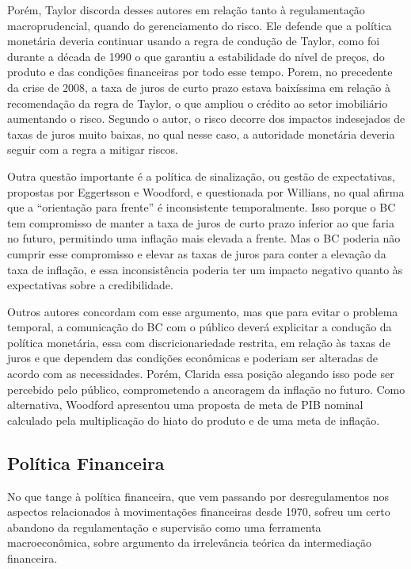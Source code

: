 \documentclass[report]{uftex}
\begin{document}
Porém, Taylor discorda desses autores em relação tanto à regulamentação macroprudencial, quando do gerenciamento do risco. Ele defende que a política monetária deveria continuar usando a regra de condução de Taylor, como foi durante a década de 1990 o que garantiu a estabilidade do nível de preços, do produto e das condições financeiras por todo esse tempo. Porem, no precedente da crise de 2008, a taxa de juros de curto prazo estava baixíssima em relação à recomendação da regra de Taylor, o que ampliou o crédito ao setor imobiliário aumentando o risco. Segundo o autor, o risco decorre dos impactos indesejados de taxas de juros muito baixas, no qual nesse caso, a autoridade monetária deveria seguir com a regra a mitigar riscos. 

Outra questão importante é a política de sinalização, ou gestão de expectativas, propostas por Eggertsson e Woodford, e questionada por Willians, no qual afirma que a ``orientação para frente” é inconsistente temporalmente. Isso porque o BC tem compromisso de manter a taxa de juros de curto prazo inferior ao que faria no futuro, permitindo uma inflação mais elevada a frente. Mas o BC poderia não cumprir esse compromisso e elevar as taxas de juros para conter a elevação da taxa de inflação, e essa inconsistência poderia ter um impacto negativo quanto às expectativas sobre a credibilidade.

Outros autores concordam com esse argumento, mas que para evitar o problema temporal, a comunicação do BC com o público deverá explicitar a condução da política monetária, essa com discricionariedade restrita, em relação às taxas de juros e que dependem das condições econômicas e poderiam ser alteradas de acordo com as necessidades. Porém, Clarida essa posição alegando isso pode ser percebido pelo público, comprometendo a ancoragem da inflação no futuro. Como alternativa, Woodford apresentou uma proposta de meta de PIB nominal calculado pela multiplicação do hiato do produto e de uma meta de inflação.

\subsection{Política Financeira}

No que tange à política financeira, que vem passando por desregulamentos nos aspectos relacionados à movimentações financeiras desde 1970, sofreu um certo abandono da regulamentação e supervisão como uma ferramenta macroeconômica, sobre argumento da irrelevância teórica da intermediação financeira. 
\end{document}
